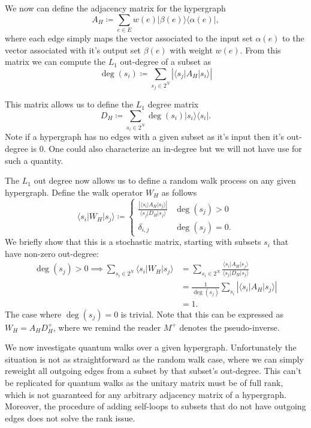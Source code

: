 \documentclass{article}
\newcommand{\ket}[1]{|#1\rangle}
\newcommand{\bra}[1]{\langle #1|}
\newcommand{\ketbra}[2]{| #1\rangle\! \langle #2|}
\newcommand{\abs}[1]{\left| #1 \right|}
\newcommand{\basei}{\ket{s_i}}
\newcommand{\base}[1]{\ket{s_{#1}}}
\newcommand{\dual}[1]{\bra{s_{#1}}}
\begin{document}
We now can define the adjacency matrix for the hypergraph
\begin{equation}
    A_H \coloneqq \sum_{e \in E} w(e) \ketbra{\beta(e)}{\alpha(e)},
\end{equation}
where each edge simply maps the vector associated to the input set $\alpha(e)$ to the vector associated with it's output set $\beta(e)$ with weight $w(e)$. From this matrix we can compute the $L_1$ out-degree of a subset as
\begin{equation}
    \deg(s_i) \coloneqq \sum_{s_j \in 2^N} \abs{\dual{j} A_H \basei}
\end{equation}

This matrix allows us to define the $L_1$ degree matrix
\begin{equation}
    D_H \coloneqq \sum_{s_i \in 2^N} \deg(s_i) \ketbra{s_i}{s_i}.
\end{equation}
Note if a hypergraph has no edges with a given subset as it's input then it's out-degree is 0. One could also characterize an in-degree but we will not have use for such a quantity.

The $L_1$ out degree now allows us to define a random walk process on any given hypergraph. Define the walk operator $W_H$ as follows
\begin{equation}
    \dual{i} W_H \base{j} \coloneqq \begin{cases}
        \frac{\abs{\dual{i} A_H \base{j}}}{\dual{j} D_H \base{j}} & \deg(s_j) > 0 \\
        \delta_{i,j} & \deg(s_j) = 0.
    \end{cases}
\end{equation}
We briefly show that this is a stochastic matrix, starting with subsets $s_i$ that have non-zero out-degree:
\begin{align}
    \deg(s_j) > 0 \implies \sum_{s_i \in 2^N} \dual{i} W_H \base{j} &= \sum_{s_i \in 2^N } \frac{\dual{i} A_H \base{j}}{\dual{j} D_H \base{j}} \\
    &= \frac{1}{\deg(s_j)} \sum_{s_i} \abs{\dual{i} A_H \base{j}} \\
    &= 1.
\end{align}
The case where $\deg(s_j) = 0$ is trivial. Note that this can be expressed as $W_H = A_H D_H^{+}$, where we remind the reader $M^+$ denotes the pseudo-inverse.

We now investigate quantum walks over a given hypergraph. Unfortunately the situation is not as straightforward as the random walk case, where we can simply reweight all outgoing edges from a subset by that subset's out-degree. This can't be replicated for quantum walks as the unitary matrix must be of full rank, which is not guaranteed for any arbitrary adjacency matrix of a hypergraph. Moreover, the procedure of adding self-loops to subsets that do not have outgoing edges does not solve the rank issue.
\end{document}
